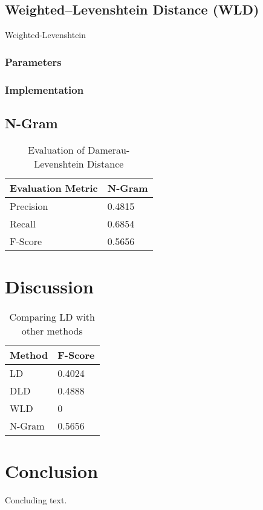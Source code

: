 \documentclass[11pt]{article}
\begin{document}
\subsection{Weighted–Levenshtein Distance (WLD)}
Weighted-Levenshtein 

\subsubsection{Parameters}

\subsubsection{Implementation}



 
\subsection{N-Gram}

\begin{table}[h]
 \begin{center}
\begin{tabular}{| l | l |}

      \hline
      Evaluation Metric & N-Gram \\
      \hline\hline
      Precision & 0.4815 \\
      Recall & 0.6854 \\
      F-Score & 0.5656 \\
      \hline

\end{tabular}
\caption{Evaluation of Damerau-Levenshtein Distance}\label{table3}
 \end{center}
\end{table}

\section{Discussion}

\begin{table}[h]
\begin{center}
\begin{tabular}{| l | l |}

      \hline
      Method & F-Score \\
      \hline\hline
      LD & 0.4024 \\
      DLD & 0.4888 \\
      WLD & 0 \\
      N-Gram &  0.5656 \\
      \hline
\end{tabular}

\caption{Comparing LD with other methods}\label{table5}
\end{center}
\end{table}


\section{Conclusion}

Concluding text.



\end{document}

